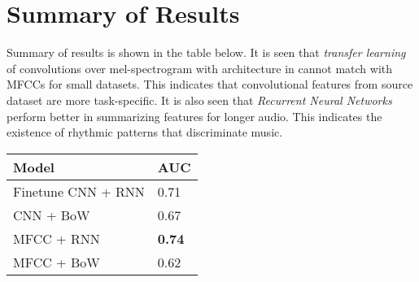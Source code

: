 \section{Summary of Results}
\label{results}
Summary of results is shown in the table below. It is seen that \textit{transfer learning} of convolutions over mel-spectrogram with architecture in \cite{choi_cnn}  cannot match with MFCCs for small datasets. This indicates that convolutional features from source dataset are more task-specific. It is also seen that \textit{Recurrent Neural Networks} perform better in summarizing features for longer audio. This indicates the existence of rhythmic patterns that discriminate music. 

   \begin{tabular}{ | p{5cm} | l |}
    \hline
    \textbf{Model} & \textbf{AUC} \\ \hline
    Finetune CNN + RNN &  0.71\\ \hline
    CNN + BoW  &  0.67\\ \hline
    MFCC + RNN &  \textbf{0.74} \\ \hline
    MFCC + BoW &  0.62 \\ \hline
    \hline
    \end{tabular}


